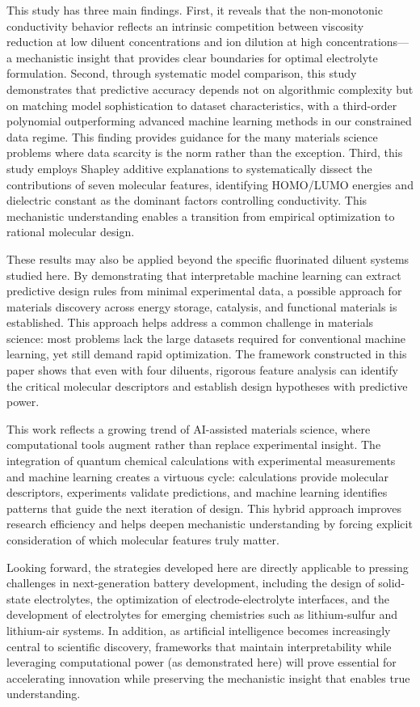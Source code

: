 \documentclass[11pt, a4paper]{article}
\begin{document}
This study has three main findings. First, it reveals that the non-monotonic conductivity behavior reflects an intrinsic competition between viscosity reduction at low diluent concentrations and ion dilution at high concentrations—a mechanistic insight that provides clear boundaries for optimal electrolyte formulation. Second, through systematic model comparison, this study demonstrates that predictive accuracy depends not on algorithmic complexity but on matching model sophistication to dataset characteristics, with a third-order polynomial outperforming advanced machine learning methods in our constrained data regime. This finding provides guidance for the many materials science problems where data scarcity is the norm rather than the exception. Third, this study employs Shapley additive explanations to systematically dissect the contributions of seven molecular features, identifying HOMO/LUMO energies and dielectric constant as the dominant factors controlling conductivity. This mechanistic understanding enables a transition from empirical optimization to rational molecular design.

These results may also be applied beyond the specific fluorinated diluent systems studied here. By demonstrating that interpretable machine learning can extract predictive design rules from minimal experimental data, a possible approach for materials discovery across energy storage, catalysis, and functional materials is established. This approach helps address a common challenge in materials science: most problems lack the large datasets required for conventional machine learning, yet still demand rapid optimization. The framework constructed in this paper shows that even with four diluents, rigorous feature analysis can identify the critical molecular descriptors and establish design hypotheses with predictive power.

This work reflects a growing trend of AI-assisted materials science, where computational tools augment rather than replace experimental insight. The integration of quantum chemical calculations with experimental measurements and machine learning creates a virtuous cycle: calculations provide molecular descriptors, experiments validate predictions, and machine learning identifies patterns that guide the next iteration of design. This hybrid approach improves research efficiency and helps deepen mechanistic understanding by forcing explicit consideration of which molecular features truly matter.

Looking forward, the strategies developed here are directly applicable to pressing challenges in next-generation battery development, including the design of solid-state electrolytes, the optimization of electrode-electrolyte interfaces, and the development of electrolytes for emerging chemistries such as lithium-sulfur and lithium-air systems. In addition, as artificial intelligence becomes increasingly central to scientific discovery, frameworks that maintain interpretability while leveraging computational power (as demonstrated here) will prove essential for accelerating innovation while preserving the mechanistic insight that enables true understanding.
\end{document}
